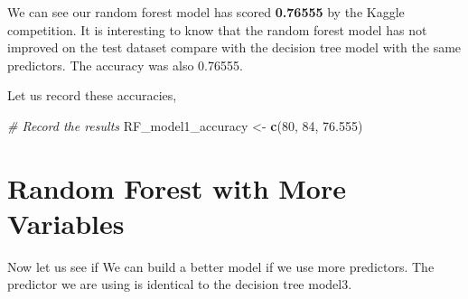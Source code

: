 \documentclass[
]{book}
\newenvironment{Shaded}{\begin{snugshade}}{\end{snugshade}}
\newcommand{\CommentTok}[1]{\textcolor[rgb]{0.56,0.35,0.01}{\textit{#1}}}
\newcommand{\DataTypeTok}[1]{\textcolor[rgb]{0.13,0.29,0.53}{#1}}
\newcommand{\DecValTok}[1]{\textcolor[rgb]{0.00,0.00,0.81}{#1}}
\newcommand{\FloatTok}[1]{\textcolor[rgb]{0.00,0.00,0.81}{#1}}
\newcommand{\KeywordTok}[1]{\textcolor[rgb]{0.13,0.29,0.53}{\textbf{#1}}}
\newcommand{\NormalTok}[1]{#1}
\newcommand{\OperatorTok}[1]{\textcolor[rgb]{0.81,0.36,0.00}{\textbf{#1}}}
\newcommand{\OtherTok}[1]{\textcolor[rgb]{0.56,0.35,0.01}{#1}}
\newcommand{\StringTok}[1]{\textcolor[rgb]{0.31,0.60,0.02}{#1}}
\begin{document}
\begin{Shaded}
\end{Shaded}

We can see our random forest model has scored \textbf{0.76555} by the Kaggle competition. It is interesting to know that the random forest model has not improved on the test dataset compare with the decision tree model with the same predictors. The accuracy was also 0.76555.

Let us record these accuracies,

\begin{Shaded}
\begin{Highlighting}[]
\CommentTok{# Record the results}
\NormalTok{RF_model1_accuracy <-}\StringTok{ }\KeywordTok{c}\NormalTok{(}\DecValTok{80}\NormalTok{, }\DecValTok{84}\NormalTok{, }\FloatTok{76.555}\NormalTok{)}
\end{Highlighting}
\end{Shaded}

\hypertarget{random-forest-with-more-variables}{%
\section{Random Forest with More Variables}\label{random-forest-with-more-variables}}

Now let us see if We can build a better model if we use more predictors. The predictor we are using is identical to the decision tree model3.
\end{document}

